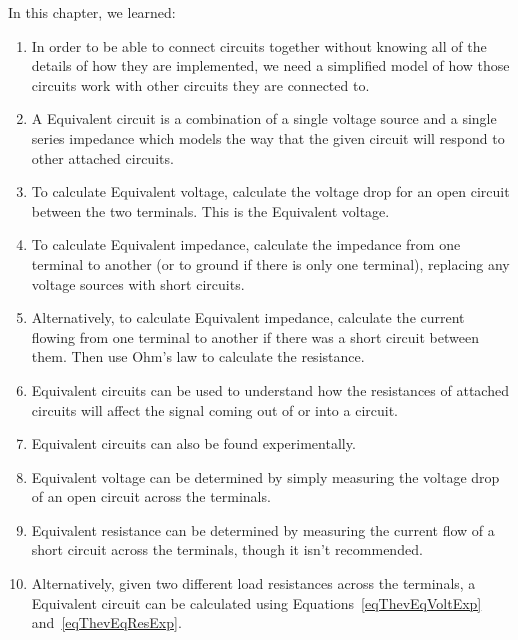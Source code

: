 \reviewsection

In this chapter, we learned:

\begin{enumerate}
\item In order to be able to connect circuits together without knowing all of the details of how they are implemented, we need a simplified model of how those circuits work with other circuits they are connected to.
\item A \thev Equivalent circuit is a combination of a single voltage source and a single series impedance which models the way that the given circuit will respond to other attached circuits.
\item To calculate \thev Equivalent voltage, calculate the voltage drop for an open circuit between the two terminals.  This is the \thev Equivalent voltage.
\item To calculate \thev Equivalent impedance, calculate the impedance from one terminal to another (or to ground if there is only one terminal), replacing any voltage sources with short circuits.
\item Alternatively, to calculate \thev Equivalent impedance, calculate the current flowing from one terminal to another if there was a short circuit between them.  Then use Ohm's law to calculate the resistance.
\item \thev Equivalent circuits can be used to understand how the resistances of attached circuits will affect the signal coming out of or into a  circuit.
\item \thev Equivalent circuits can also be found experimentally.  
\item \thev Equivalent voltage can be determined by simply measuring the voltage drop of an open circuit across the terminals.
\item \thev Equivalent resistance can be determined by measuring the current flow of a short circuit across the terminals, though it isn't recommended.
\item Alternatively, given two different load resistances across the terminals, a \thev Equivalent circuit can be calculated using Equations~\ref{eqThevEqVoltExp} and~\ref{eqThevEqResExp}.
\end{enumerate}

\applysection

